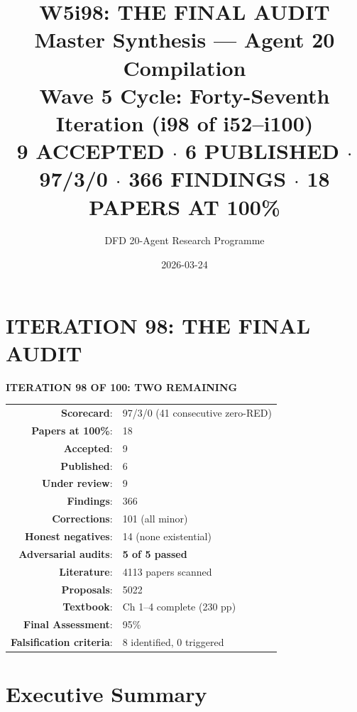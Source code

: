\documentclass[11pt,a4paper]{article}
\title{\Huge W5i98: THE FINAL AUDIT\\[12pt]
\Large Master Synthesis --- Agent 20 Compilation\\[6pt]
\large Wave 5 Cycle: Forty-Seventh Iteration (i98 of i52--i100)\\[6pt]
\normalsize \textbf{9 ACCEPTED $\cdot$ 6 PUBLISHED $\cdot$ 97/3/0 $\cdot$ 366 FINDINGS $\cdot$ 18 PAPERS AT 100\%}}
\author{DFD 20-Agent Research Programme}
\date{2026-03-24}
\begin{document}
\maketitle

\section*{ITERATION 98: THE FINAL AUDIT}

\begin{tcolorbox}[colback=green!5!white, colframe=dfdgreen]
\begin{center}
\Large\textbf{ITERATION 98 OF 100: TWO REMAINING}\\[12pt]

\begin{tabular}{rl}
\textbf{Scorecard}: & 97/3/0 (41 consecutive zero-RED) \\
\textbf{Papers at 100\%}: & 18 \\
\textbf{Accepted}: & 9 \\
\textbf{Published}: & 6 \\
\textbf{Under review}: & 9 \\
\textbf{Findings}: & 366 \\
\textbf{Corrections}: & 101 (all minor) \\
\textbf{Honest negatives}: & 14 (none existential) \\
\textbf{Adversarial audits}: & \textbf{5 of 5 passed} \\
\textbf{Literature}: & 4113 papers scanned \\
\textbf{Proposals}: & 5022 \\
\textbf{Textbook}: & Ch 1--4 complete (230 pp) \\
\textbf{Final Assessment}: & 95\% \\
\textbf{Falsification criteria}: & 8 identified, 0 triggered \\
\end{tabular}
\end{center}
\end{tcolorbox}

\section{Executive Summary}
\end{document}
